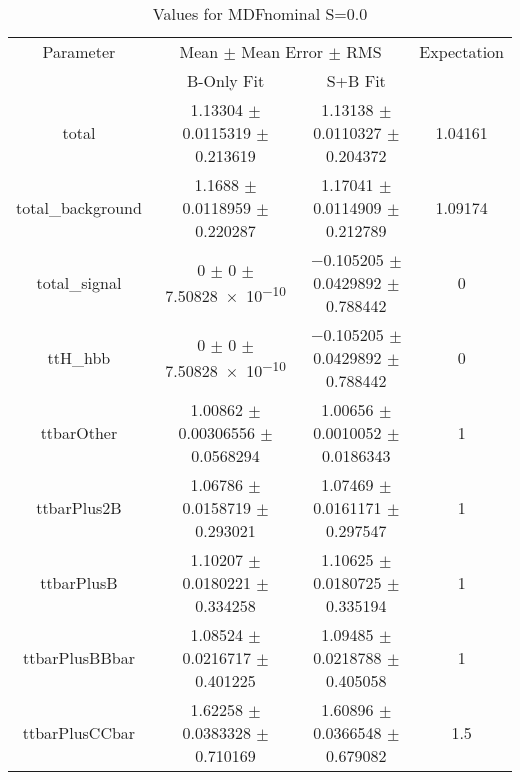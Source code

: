 \begin{table}
\centering
\caption{Values for MDFnominal S=0.0}
\begin{tabular}{cccc}
\toprule
Parameter & \multicolumn{2}{c}{Mean $\pm$ Mean Error $\pm$ RMS} & Expectation\\
 & B-Only Fit & S+B Fit & \\
\midrule
total & \num{1.13304} $\pm$ \num{0.0115319} $\pm$ \num{0.213619} & \num{1.13138} $\pm$ \num{0.0110327} $\pm$ \num{0.204372} & \num{1.04161}\\
total\_background & \num{1.1688} $\pm$ \num{0.0118959} $\pm$ \num{0.220287} & \num{1.17041} $\pm$ \num{0.0114909} $\pm$ \num{0.212789} & \num{1.09174}\\
total\_signal & \num{0} $\pm$ \num{0} $\pm$ \num{7.50828e-10} & \num{-0.105205} $\pm$ \num{0.0429892} $\pm$ \num{0.788442} & \num{0}\\
ttH\_hbb & \num{0} $\pm$ \num{0} $\pm$ \num{7.50828e-10} & \num{-0.105205} $\pm$ \num{0.0429892} $\pm$ \num{0.788442} & \num{0}\\
ttbarOther & \num{1.00862} $\pm$ \num{0.00306556} $\pm$ \num{0.0568294} & \num{1.00656} $\pm$ \num{0.0010052} $\pm$ \num{0.0186343} & \num{1}\\
ttbarPlus2B & \num{1.06786} $\pm$ \num{0.0158719} $\pm$ \num{0.293021} & \num{1.07469} $\pm$ \num{0.0161171} $\pm$ \num{0.297547} & \num{1}\\
ttbarPlusB & \num{1.10207} $\pm$ \num{0.0180221} $\pm$ \num{0.334258} & \num{1.10625} $\pm$ \num{0.0180725} $\pm$ \num{0.335194} & \num{1}\\
ttbarPlusBBbar & \num{1.08524} $\pm$ \num{0.0216717} $\pm$ \num{0.401225} & \num{1.09485} $\pm$ \num{0.0218788} $\pm$ \num{0.405058} & \num{1}\\
ttbarPlusCCbar & \num{1.62258} $\pm$ \num{0.0383328} $\pm$ \num{0.710169} & \num{1.60896} $\pm$ \num{0.0366548} $\pm$ \num{0.679082} & \num{1.5}\\
\bottomrule
\end{tabular}
\end{table}